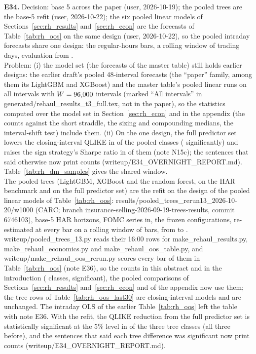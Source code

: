 \documentclass[11pt]{article}
\newcommand{\editc}[3]{%
  \par\smallskip\noindent
  \begingroup
  \setlength{\fboxsep}{3pt}%
  \colorbox{#1!12}{%
    \parbox{\dimexpr\linewidth-2\fboxsep\relax}{%
      \raggedright\footnotesize\textcolor{#1!75!black}{\textbf{#2.} #3}%
    }%
  }%
  \endgroup
  \par\smallskip
}
\newcommand{\editc}[3]{\ignorespaces}
\begin{document}
\editc{orange}{E34}{Decision: base 5 across the paper (user, 2026-10-19); the pooled trees are the base-5 refit (user, 2026-10-22); the six pooled linear models of Sections~\ref{sec:rh_results} and~\ref{sec:rh_econ} are the forecasts of Table~\ref{tab:rh_oos} on the same design (user, 2026-10-22), so the \rhrPoolN{} pooled intraday forecasts share one design: the \rhePoolNBars{} regular-hours bars, a rolling window of \rhePoolWindowDays{} trading days, evaluation from \rhePoolRunStart.\\Problem: (i) the model set (the \cmMasterN{} forecasts of the master table) still holds earlier designs: the earlier draft's pooled 48-interval forecasts (the ``paper'' family, among them its LightGBM and XGBoost) and the master table's pooled linear runs on all \rhdmNIntervals{} intervals with $W = 96{,}000$ intervals (marked ``All \rhdmNIntervals{} intervals'' in generated/rehaul\_results\_t3\_full.tex, not in the paper), so the statistics computed over the model set in Section~\ref{sec:rh_econ} and in the appendix (the counts against the short straddle, the sizing and compounding medians, the interval-shift test) include them. (ii) On the one design, the full predictor set lowers the closing-interval QLIKE in \rhrAfPoolLower{} of the \rhrAfPoolPairs{} pooled classes (\rhrAfPoolLowerSig{} significantly) and raises the sign strategy's Sharpe ratio in \rhrAfPoolShHigher{} of them (note N15c); the sentences that said otherwise now print counts (writeup/E34\_OVERNIGHT\_REPORT.md). Table~\ref{tab:rh_dm_samples} gives the shared window.\\
The pooled trees (LightGBM, XGBoost and the random forest, on the HAR benchmark and on the full predictor set) are the refit on the design of the pooled linear models of Table~\ref{tab:rh_oos}: results/pooled\_trees\_rerun13\_2026-10-20/w1000 (CARC; branch insurance-selling-2026-09-19-trees-results, commit 6746103), base-5 HAR horizons, FOMC series in, the frozen configurations, re-estimated at every bar on a rolling window of \rheTreeWindowBars{} bars, from \rheTreeRunStart{} to \rhorSpanEnd. writeup/pooled\_trees\_13.py reads their 16:00 rows for make\_rehaul\_results.py, make\_rehaul\_economics.py and make\_rehaul\_oos\_table.py, and writeup/make\_rehaul\_oos\_rerun.py scores every bar of them in Table~\ref{tab:rh_oos} (note E36), so the counts in this abstract and in the introduction (\rhrAfPoolPairs{} classes, \rhrAfPoolLowerSig{} significant), the pooled comparisons of Sections~\ref{sec:rh_results} and~\ref{sec:rh_econ} and of the appendix now use them; the tree rows of Table~\ref{tab:rh_oos_last30} are closing-interval models and are unchanged. The intraday OLS of the earlier Table~\ref{tab:rh_oos} left the table with note E36. With the refit, the QLIKE reduction from the full predictor set is statistically significant at the 5\% level in \rhrAfPoolTreeLowerSig{} of the three tree classes (all three before), and the sentences that said each tree difference was significant now print counts (writeup/E34\_OVERNIGHT\_REPORT.md).}
\end{document}

